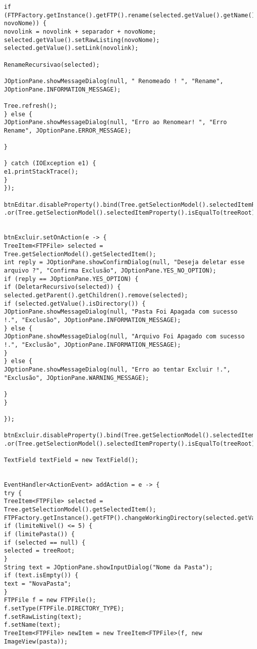 \documentclass[12pt]{article}
\begin{document}
\begin{lstlisting}
if (FTPFactory.getInstance().getFTP().rename(selected.getValue().getName(), novoNome)) {
novolink = novolink + separador + novoNome;
selected.getValue().setRawListing(novoNome);
selected.getValue().setLink(novolink);

RenameRecursivao(selected);

JOptionPane.showMessageDialog(null, " Renomeado ! ", "Rename", JOptionPane.INFORMATION_MESSAGE);

Tree.refresh();
} else {
JOptionPane.showMessageDialog(null, "Erro ao Renomear! ", "Erro Rename", JOptionPane.ERROR_MESSAGE);

}

} catch (IOException e1) {
e1.printStackTrace();
}
});

btnEditar.disableProperty().bind(Tree.getSelectionModel().selectedItemProperty().isNull()
.or(Tree.getSelectionModel().selectedItemProperty().isEqualTo(treeRoot)));


btnExcluir.setOnAction(e -> {
TreeItem<FTPFile> selected = Tree.getSelectionModel().getSelectedItem();
int reply = JOptionPane.showConfirmDialog(null, "Deseja deletar esse arquivo ?", "Confirma Exclusão", JOptionPane.YES_NO_OPTION);
if (reply == JOptionPane.YES_OPTION) {
if (DeletarRecursivo(selected)) {
selected.getParent().getChildren().remove(selected);
if (selected.getValue().isDirectory()) {
JOptionPane.showMessageDialog(null, "Pasta Foi Apagada com sucesso !.", "Exclusão", JOptionPane.INFORMATION_MESSAGE);
} else {
JOptionPane.showMessageDialog(null, "Arquivo Foi Apagado com sucesso !.", "Exclusão", JOptionPane.INFORMATION_MESSAGE);
}
} else {
JOptionPane.showMessageDialog(null, "Erro ao tentar Excluir !.", "Exclusão", JOptionPane.WARNING_MESSAGE);

}
}

});

btnExcluir.disableProperty().bind(Tree.getSelectionModel().selectedItemProperty().isNull()
.or(Tree.getSelectionModel().selectedItemProperty().isEqualTo(treeRoot)));

TextField textField = new TextField();


EventHandler<ActionEvent> addAction = e -> {
try {
TreeItem<FTPFile> selected = Tree.getSelectionModel().getSelectedItem();
FTPFactory.getInstance().getFTP().changeWorkingDirectory(selected.getValue().getLink());
if (limiteNivel() <= 5) {
if (limitePasta()) {
if (selected == null) {
selected = treeRoot;
}
String text = JOptionPane.showInputDialog("Nome da Pasta");
if (text.isEmpty()) {
text = "NovaPasta";
}
FTPFile f = new FTPFile();
f.setType(FTPFile.DIRECTORY_TYPE);
f.setRawListing(text);
f.setName(text);
TreeItem<FTPFile> newItem = new TreeItem<FTPFile>(f, new ImageView(pasta));


\end{lstlisting}
\end{document}
